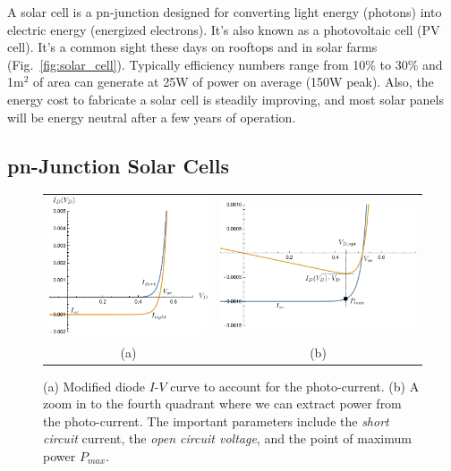 A solar cell is a pn-junction designed for converting light energy (photons) into electric energy (energized electrons).  It's also known as a photovoltaic cell (PV cell).  It's a common sight these days on rooftops and in solar farms (Fig.~\ref{fig:solar_cell}).   Typically efficiency numbers range from 10\% to 30\% and 1m$^2$ of area can generate at 25W of power on average (150W peak).  Also, the energy cost to fabricate a solar cell is steadily improving, and most solar panels will be energy neutral after a few years of operation.

 


\subsection{pn-Junction Solar Cells}


\begin{figure}[tb]
\begin{center}
\begin{tabular}{cc}
\includegraphics[width=.5\columnwidth]{solarcell_zoomout.pdf} &
\includegraphics[width=.5\columnwidth]{solarcell.pdf} \\
(a) & (b) \\
\end{tabular}
\end{center}
\caption{(a) Modified diode $I$-$V$ curve to account for the photo-current.  (b)  A zoom in to the fourth quadrant where we can extract power from the photo-current.  The important parameters include the \emph{short circuit} current, the \emph{open circuit voltage}, and the point of maximum power $P_{max}$. } \label{fig:solarcell_zoom}
\end{figure}


